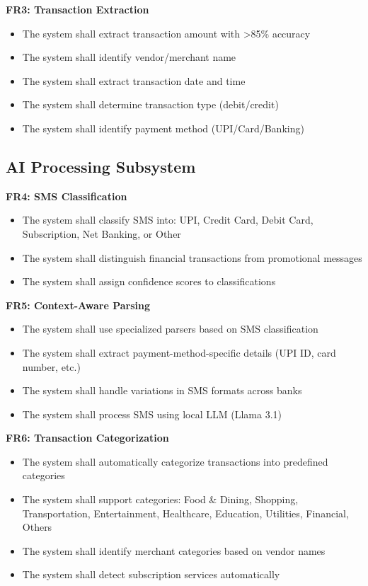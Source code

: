 \documentclass[11pt,a4paper]{report}
\begin{document}
\textbf{FR3: Transaction Extraction}
\begin{itemize}
    \item The system shall extract transaction amount with >85\% accuracy
    \item The system shall identify vendor/merchant name
    \item The system shall extract transaction date and time
    \item The system shall determine transaction type (debit/credit)
    \item The system shall identify payment method (UPI/Card/Banking)
\end{itemize}

\subsection{AI Processing Subsystem}

\textbf{FR4: SMS Classification}
\begin{itemize}
    \item The system shall classify SMS into: UPI, Credit Card, Debit Card, Subscription, Net Banking, or Other
    \item The system shall distinguish financial transactions from promotional messages
    \item The system shall assign confidence scores to classifications
\end{itemize}

\textbf{FR5: Context-Aware Parsing}
\begin{itemize}
    \item The system shall use specialized parsers based on SMS classification
    \item The system shall extract payment-method-specific details (UPI ID, card number, etc.)
    \item The system shall handle variations in SMS formats across banks
    \item The system shall process SMS using local LLM (Llama 3.1)
\end{itemize}

\textbf{FR6: Transaction Categorization}
\begin{itemize}
    \item The system shall automatically categorize transactions into predefined categories
    \item The system shall support categories: Food \& Dining, Shopping, Transportation, Entertainment, Healthcare, Education, Utilities, Financial, Others
    \item The system shall identify merchant categories based on vendor names
    \item The system shall detect subscription services automatically
\end{itemize}
\end{document}
